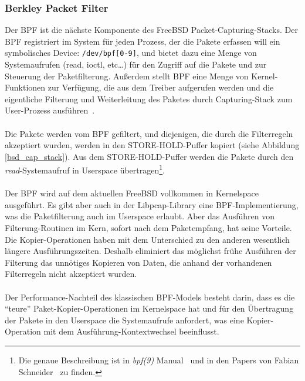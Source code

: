 \subsubsection{Berkley Packet Filter}\label{sec:bpf}
Der BPF ist die nächste Komponente des FreeBSD Packet-Capturing-Stacks. Der BPF
registriert im System für jeden Prozess, der die Pakete erfassen will ein
symbolisches Device: \verb+/dev/bpf[0-9]+, und bietet dazu eine Menge von
Systemaufrufen (read, ioctl, etc\ldots) für den Zugriff auf die Pakete und zur
Steuerung der Paketfilterung.  Außerdem stellt BPF eine Menge von
Kernel-Funktionen zur Verfügung, die aus dem Treiber aufgerufen werden und die
eigentliche Filterung und Weiterleitung des Paketes durch Capturing-Stack zum
User-Prozess ausführen~\cite{man_kernel_bpf, man_bpf, bpf_paper}.\\\\
%
Die Pakete werden vom BPF gefiltert, und diejenigen, die durch die Filterregeln
akzeptiert wurden, werden in den STORE-HOLD-Puffer kopiert (siehe Abbildung
\ref{bsd_cap_stack}).  Aus dem STORE-HOLD-Puffer werden die Pakete durch den
\emph{read}-Systemaufruf in Userspace übertragen\footnote{Die genaue Beschreibung
ist in \emph{bpf(9)} Manual~\cite{man_kernel_bpf} und in den Papers von Fabian
Schneider~\cite{fabian_da, pcin10gb_paper} zu finden.}.\\\\
%
Der BPF wird auf dem aktuellen FreeBSD vollkommen in Kernelspace ausgeführt.
Es gibt aber auch in der Libpcap-Library eine BPF-Implementierung, was  die
Paketfilterung auch im Userspace erlaubt. Aber das Ausführen von
Filterung-Routinen im Kern, sofort nach dem Paketempfang, hat seine Vorteile.
Die Kopier-Operationen haben mit dem Unterschied zu den anderen wesentlich
längere Ausführungszeiten. Deshalb eliminiert das möglichst frühe Ausführen der
Filterung  das unnötiges Kopieren von Daten, die anhand der vorhandenen
Filterregeln nicht akzeptiert wurden.\\\\
%
Der Performance-Nachteil des klassischen BPF-Models besteht darin, dass es die
``teure'' Paket-Kopier-Operationen im Kernelspace hat und für den Übertragung
der Pakete in den Userspace die Systemaufrufe anfordert, was eine
Kopier-Operation mit dem Ausführung-Kontextwechsel beeinflusst.

